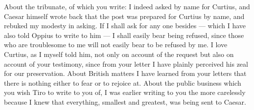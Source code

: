  About the tribunate, of which you write: I indeed asked by name for Curtius, and Caesar himself wrote back that the post was prepared for Curtius by name, and rebuked my modesty in asking. If I shall ask for any one besides --- which I have also told Oppius to write to him --- I shall easily bear being refused, since those who are troublesome to me will not easily bear to be refused by me. I love Curtius, as I myself told him, not only on account of the request but also on account of your testimony, since from your letter I have plainly perceived his zeal for our preservation. About British matters I have learned from your letters that there is nothing either to fear or to rejoice at. About the public business which you wish Tiro to write to you of, I was earlier writing to you the more carelessly because I knew that everything, smallest and greatest, was being sent to Caesar.

